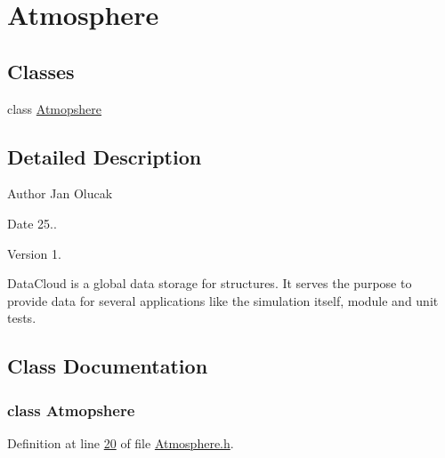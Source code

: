 \hypertarget{group___atmosphere}{}\section{Atmosphere}
\label{group___atmosphere}
\subsection*{Classes}
\begin{DoxyCompactItemize}
\item 
class \hyperlink{group___atmosphere_class_atmopshere}{Atmopshere}
\end{DoxyCompactItemize}


\subsection{Detailed Description}
\begin{DoxyAuthor}{Author}
Jan Olucak 
\end{DoxyAuthor}
\begin{DoxyDate}{Date}
25.. 
\end{DoxyDate}
\begin{DoxyVersion}{Version}
1.
\end{DoxyVersion}
Data\+Cloud is a global data storage for structures. It serves the purpose to provide data for several applications like the simulation itself, module and unit tests. 

\subsection{Class Documentation}
\label{class_atmopshere}
\subsubsection{class Atmopshere}


Definition at line \hyperlink{_atmosphere_8h_source_l00020}{20} of file \hyperlink{_atmosphere_8h_source}{Atmosphere.\+h}.

